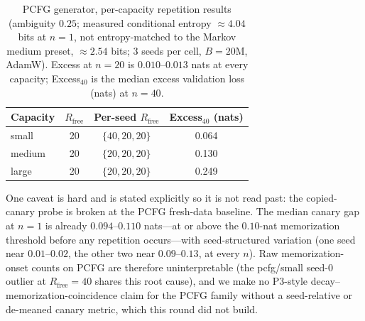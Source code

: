 \documentclass[11pt]{article}
\begin{document}
\begin{table}[htbp]
\centering
\caption{PCFG generator, per-capacity repetition results (ambiguity $0.25$;
measured conditional entropy ${\approx}4.04$ bits at $n{=}1$, not entropy-matched to
the Markov medium preset, ${\approx}2.54$ bits; 3 seeds per cell, $B=20$M, AdamW).
Excess at $n=20$ is $0.010$--$0.013$ nats at every capacity; Excess$_{40}$ is the
median excess validation loss (nats) at $n=40$.}
\label{tab:pcfg}
\scriptsize
\begin{tabular}{@{}lccc@{}}
\toprule
Capacity & $R_{\mathrm{free}}$ & Per-seed $R_{\mathrm{free}}$ & Excess$_{40}$ (nats) \\
\midrule
small  & 20 & $\{40,20,20\}$ & 0.064 \\
medium & 20 & $\{20,20,20\}$ & 0.130 \\
large  & 20 & $\{20,20,20\}$ & 0.249 \\
\bottomrule
\end{tabular}
\end{table}

One caveat is hard and is stated explicitly so it is not read past: the
copied-canary probe is broken at the PCFG fresh-data baseline. The median canary
gap at $n=1$ is already $0.094$--$0.110$ nats---at or above the $0.10$-nat
memorization threshold before any repetition occurs---with seed-structured
variation (one seed near $0.01$--$0.02$, the other two near $0.09$--$0.13$, at every
$n$). Raw memorization-onset counts on PCFG are therefore uninterpretable (the
pcfg/small seed-0 outlier at $R_{\mathrm{free}}=40$ shares this root cause), and we
make no P3-style decay--memorization-coincidence claim for the PCFG family without
a seed-relative or de-meaned canary metric, which this round did not build.
\end{document}
